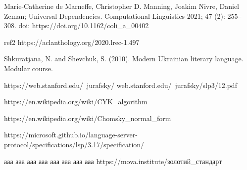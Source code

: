 \thispagestyle{empty}
\begin{thebibliography}{99}

{}

Marie-Catherine de Marneffe, Christopher D. Manning, Joakim Nivre, Daniel Zeman;
Universal Dependencies. Computational Linguistics 2021; 47 (2): 255–308. doi:
https://doi.org/10.1162/coli\_a\_00402

 ref2
https://aclanthology.org/2020.lrec-1.497

Shkuratjana, N. and Shevchuk, S. (2010). Modern Ukrainian literary language. Modular course.

https://web.stanford.edu/~jurafsky/
web.stanford.edu/~jurafsky/slp3/12.pdf

https://en.wikipedia.org/wiki/CYK\_algorithm

https://en.wikipedia.org/wiki/Chomsky\_normal\_form

https://microsoft.github.io/language-server-protocol/specifications/lsp/3.17/specification/



ааа
ааа
ааа
ааа
ааа
ааа
ааа
ааа
https://mova.institute/золотий\_стандарт

\end{thebibliography}